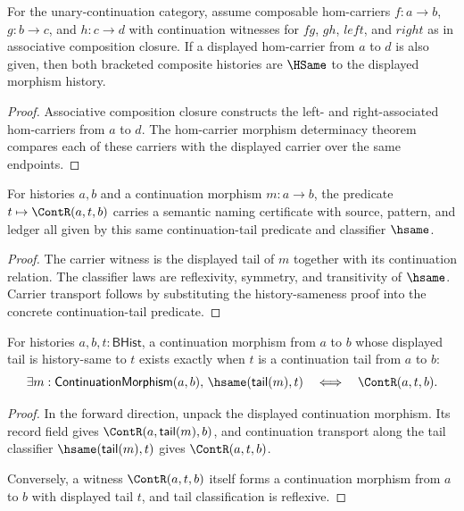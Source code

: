 \begin{theorem}
\label{thm:category-hom-carrier-comp-assoc-displayed-deterministic}
For the unary-continuation category, assume composable hom-carriers
$f:a\to b$, $g:b\to c$, and $h:c\to d$ with continuation witnesses for
$fg$, $gh$, $left$, and $right$ as in associative composition closure. If a
displayed hom-carrier from $a$ to $d$ is also given, then both bracketed
composite histories are $\HSame$ to the displayed morphism history.
\end{theorem}
\begin{proof}
Associative composition closure constructs the left- and right-associated
hom-carriers from $a$ to $d$. The hom-carrier morphism determinacy theorem
compares each of these carriers with the displayed carrier over the same
endpoints.
\end{proof}

\begin{theorem}
\label{thm:category-continuation-morphism-tail-semantic-namecert}
For histories $a,b$ and a continuation morphism $m:a\to b$, the predicate
$t\mapsto\ContR(a,t,b)$ carries a semantic naming certificate with source,
pattern, and ledger all given by this same continuation-tail predicate and
classifier $\hsame$.
\end{theorem}
\begin{proof}
The carrier witness is the displayed tail of $m$ together with its continuation
relation. The classifier laws are reflexivity, symmetry, and transitivity of
$\hsame$. Carrier transport follows by substituting the history-sameness proof
into the concrete continuation-tail predicate.
\end{proof}

\begin{theorem}
\label{thm:continuation-morphism-tail-cont-witness-iff}
For histories $a,b,t:\mathsf{BHist}$, a continuation morphism from $a$ to $b$
whose displayed tail is history-same to $t$ exists exactly when $t$ is a
continuation tail from $a$ to $b$:
$$
\exists m:\mathsf{ContinuationMorphism}(a,b),\,
\hsame(\mathsf{tail}(m),t)
\quad\Longleftrightarrow\quad
\ContR(a,t,b).
$$
\end{theorem}
\begin{proof}
In the forward direction, unpack the displayed continuation morphism. Its
record field gives $\ContR(a,\mathsf{tail}(m),b)$, and continuation transport
along the tail classifier $\hsame(\mathsf{tail}(m),t)$ gives
$\ContR(a,t,b)$.

Conversely, a witness $\ContR(a,t,b)$ itself forms a continuation morphism
from $a$ to $b$ with displayed tail $t$, and tail classification is reflexive.
\end{proof}

